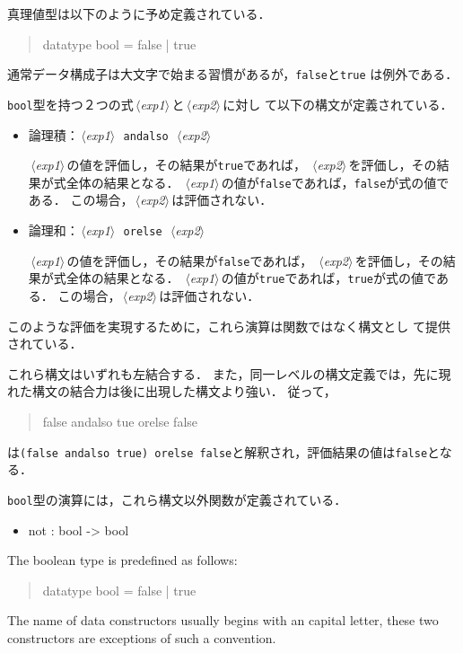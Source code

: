\documentclass{jbook}
\newcommand{\code}[1]{\mbox{\large\tt #1}}
\newcommand{\nonterm}[1]{\mbox{$\,\langle$}{\it #1}\mbox{$\rangle\,$}}
\newcommand{\term}[1]{\mbox{{\tt #1}}}
\newenvironment{program}{\begin{quote}\begin{tt}}%
                        {\end{tt}\end{quote}}
\begin{document}
\ifjp%
	真理値型は以下のように予め定義されている．
\begin{program}
datatype bool = false | true
\end{program}
通常データ構成子は大文字で始まる習慣があるが，\code{false}と\code{true}
は例外である．

	\code{bool}型を持つ２つの式\nonterm{exp1}と\nonterm{exp2}に対し
て以下の構文が定義されている．
\begin{itemize}
\item 論理積：\nonterm{exp1}\ \term{andalso}\ \nonterm{exp2} 

\nonterm{exp1}の値を評価し，その結果が\code{true}であれば，
\nonterm{exp2}を評価し，その結果が式全体の結果となる．
\nonterm{exp1}の値が\code{false}であれば，\code{false}が式の値である．
	この場合，\nonterm{exp2}は評価されない．

\item 論理和：\nonterm{exp1}\ \term{orelse}\ \nonterm{exp2}

	\nonterm{exp1}の値を評価し，その結果が\code{false}であれば，
\nonterm{exp2}を評価し，その結果が式全体の結果となる．
\nonterm{exp1}の値が\code{true}であれば，\code{true}が式の値である．
	この場合，\nonterm{exp2}は評価されない．
\end{itemize}
	このような評価を実現するために，これら演算は関数ではなく構文とし
て提供されている．

	これら構文はいずれも左結合する．
	また，同一レベルの構文定義では，先に現れた構文の結合力は後に出現した構文より強い．
	従って，
\begin{program}
false andalso tue orelse false
\end{program}
は\code{(false andalso true) orelse false}と解釈され，評価結果の値は\code{false}となる．

	\code{bool}型の演算には，これら構文以外関数が定義されている．
\begin{itemize}
\item not : bool -> bool
\end{itemize}
\else%
	The boolean type is predefined as follows:
\begin{program}
datatype bool = false | true
\end{program}
	The name of data constructors usually begins with an capital
letter, these two constructors are exceptions of such a convention.
\end{document}
